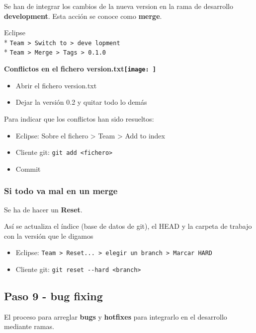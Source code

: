 Se han de integrar los cambios de la nueva version en la rama de
desarrollo\\ \textbf{development}. Esta acción se conoce como
\textbf{merge}.

Eclipse\\*
\texttt{Team \textgreater{} Switch to \textgreater{} deve lopment}\\*
\texttt{Team \textgreater{} Merge \textgreater{} Tags \textgreater{} 0.1.0}

\textbf{Conflictos en el fichero version.txt\texttt{[image: ]}}

\begin{itemize}
\item
  Abrir el fichero version.txt
\item
  Dejar la versión 0.2 y quitar todo lo demás
\end{itemize}
Para indicar que los conflictos han sido resueltos:

\begin{itemize}
\item
  Eclipse: Sobre el fichero \textgreater{} Team \textgreater{} Add to
  index
\item
  Cliente git: \texttt{git add \textless{}fichero\textgreater{}}
\item
  Commit
\end{itemize}
\subsubsection{Si todo va mal en un merge}

Se ha de hacer un \textbf{Reset}.

Así se actualiza el índice (base de datos de git), el HEAD y la carpeta
de trabajo con la versión que le digamos

\begin{itemize}
\item
  Eclipse:
  \texttt{Team \textgreater{} Reset... \textgreater{} elegir un branch \textgreater{} Marcar HARD}
\item
  Cliente git:
  \texttt{git reset -{}-hard \textless{}branch\textgreater{}}
\end{itemize}
\subsection{Paso 9 - bug fixing}

El proceso para arreglar \textbf{bugs} y \textbf{hotfixes} para
integrarlo en el desarrollo mediante ramas.

